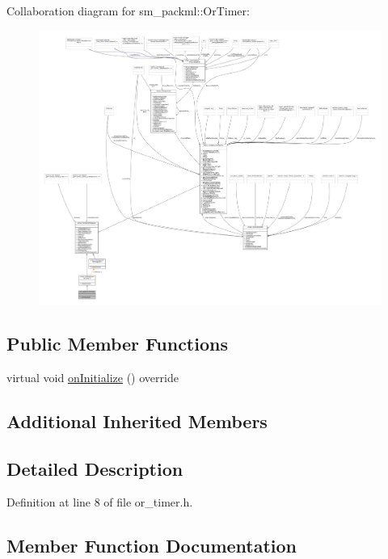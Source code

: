 Collaboration diagram for sm\+\_\+packml\+:\+:Or\+Timer\+:
\nopagebreak
\begin{figure}[H]
\begin{center}
\leavevmode
\includegraphics[width=350pt]{classsm__packml_1_1OrTimer__coll__graph}
\end{center}
\end{figure}
\subsection*{Public Member Functions}
\begin{DoxyCompactItemize}
\item 
virtual void \hyperlink{classsm__packml_1_1OrTimer_a8d58fc4bc720607c22db35a13f05826e}{on\+Initialize} () override
\end{DoxyCompactItemize}
\subsection*{Additional Inherited Members}


\subsection{Detailed Description}


Definition at line 8 of file or\+\_\+timer.\+h.



\subsection{Member Function Documentation}
\mbox{\label{classsm__packml_1_1OrTimer_a8d58fc4bc720607c22db35a13f05826e}} 
